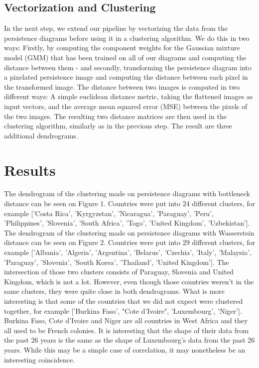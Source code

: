 \documentclass[12pt]{article}
\begin{document}
\subsection{Vectorization and Clustering}
In the next step, we extend our pipeline by vectorizing the data from the persistence diagrams before using it in a clustering algorithm. We do this in two ways: Firstly, by computing the component weights for the Gaussian mixture model (GMM) that has been trained on all of our diagrams and computing the distance between them - and secondly, transforming the persistence diagram into a pixelated persistence image \cite{adams2017persistence} and computing the distance between each pixel in the transformed image. The distance between two images is computed in two different ways: A simple euclidean distance metric, taking the flattened images as input vectors, and the average mean squared error (MSE) between the pixels of the two images. The resulting two distance matrices are then used in the clustering algorithm, similarly as in the previous step. The result are three additional dendrograms.

\section{Results}
The dendrogram of the clustering made on persistence diagrams with bottleneck distance can be seen on Figure 1. Countries were put into 24 different clusters, for example ['Costa Rica', 'Kyrgyzstan', 'Nicaragua', 'Paraguay', 'Peru', 'Philippines', 'Slovenia', 'South Africa', 'Togo', 'United Kingdom', 'Uzbekistan']. The dendrogram of the clustering made on persistence diagrams with Wasserstein distance can be seen on Figure 2. Countries were put into 29 different clusters, for example ['Albania', 'Algeria', 'Argentina', 'Belarus', 'Czechia', 'Italy', 'Malaysia', 'Paraguay', 'Slovenia', 'South Korea', 'Thailand', 'United Kingdom']. The intersection of those two clusters consists of  Paraguay, Slovenia and United Kingdom, which is not a lot. However, even though those countries weren't in the same clusters, they were quite close in both dendrograms. What is more interesting
is that some of the countries that we did not expect were clustered together, for example ['Burkina Faso', "Cote d'Ivoire", 'Luxembourg', 'Niger']. Burkina Faso, Cote d'Ivoire and Niger are all countries in West Africa and they all used to be French colonies. It is interesting that the shape of their data from the past 26 years is the same as the shape of Luxembourg's data from the past 26 years. While this may be a simple case of correlation, it may nonetheless be an interesting coincidence.
\end{document}
